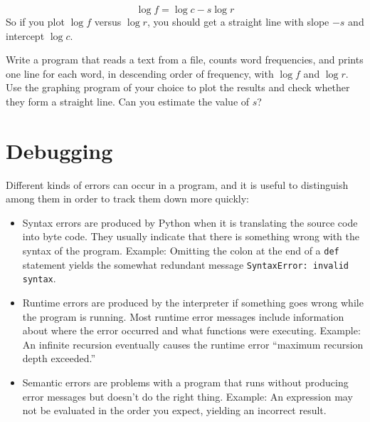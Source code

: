 \documentclass[10pt]{book}
\begin{document}
{\begin{ex}
\[ \log f = \log c - s \log r \]
%
So if you plot $\log f$ versus $\log r$, you should get
a straight line with slope $-s$ and intercept $\log c$.

Write a program that reads a text from a file, counts
word frequencies, and prints one line
for each word, in descending order of frequency, with
$\log f$ and $\log r$.  Use the graphing program of your
choice to plot the results and check whether they form
a straight line.  Can you estimate the value of $s$?
\end{ex}



\appendix

\chapter{Debugging}

Different kinds of errors can occur
in a program, and it is useful to distinguish among them
in order to track them down more quickly:

\begin{itemize}

\item Syntax errors are produced by Python when it is translating the
  source code into byte code.  They usually indicate that there is
  something wrong with the syntax of the program.  Example: Omitting
  the colon at the end of a {\tt def} statement yields the somewhat
  redundant message {\tt SyntaxError: invalid syntax}.

\item Runtime errors are produced by the interpreter if something goes
  wrong while the program is running.  Most runtime error messages
  include information about where the error occurred and what
  functions were executing.  Example: An infinite recursion eventually
  causes the runtime error ``maximum recursion depth exceeded.''

\item Semantic errors are problems with a program that runs without
  producing error messages but doesn't do the right thing.  Example:
  An expression may not be evaluated in the order you expect, yielding
  an incorrect result.

\end{itemize}


}
\end{document}
